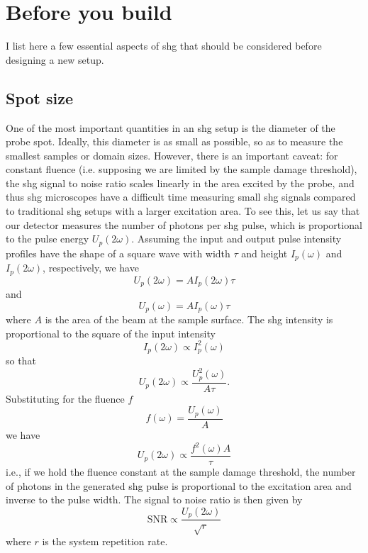 \section{Before you build}\label{sec:beforeyoubuild}

I list here a few essential aspects of \gls{shg} that should be considered before designing a new setup.

\subsection{Spot size}

One of the most important quantities in an \gls{shg} setup is the diameter of the probe spot.
Ideally, this diameter is as small as possible, so as to measure the smallest samples or domain sizes.
However, there is an important caveat: for constant fluence (i.e. supposing we are limited by the sample damage threshold), the \gls{shg} signal to noise ratio scales linearly in the area excited by the probe, and thus \gls{shg} microscopes have a difficult time measuring small \gls{shg} signals compared to traditional \gls{shg} setups with a larger excitation area.
To see this, let us say that our detector measures the number of photons per \gls{shg} pulse, which is proportional to the pulse energy $U_p(2\omega)$.
Assuming the input and output pulse intensity profiles have the shape of a square wave with width $\tau$ and height $I_p(\omega)$ and $I_p(2\omega)$, respectively, we have
\begin{equation}
U_p(2\omega) = A I_p(2\omega) \tau
\end{equation}
and
\begin{equation}
U_p(\omega) = A I_p(\omega) \tau
\end{equation}
where $A$ is the area of the beam at the sample surface.
The \gls{shg} intensity is proportional to the square of the input intensity
\begin{equation}
I_p(2\omega) \propto I_p^2(\omega)
\end{equation}
so that
\begin{equation}
U_p(2\omega) \propto \frac{U_p^2(\omega)}{A\tau}.
\end{equation}
Substituting for the fluence $f$
\begin{equation}
f(\omega) = \frac{U_p(\omega)}{A}
\end{equation}
we have
\begin{equation}
U_p(2\omega) \propto \frac{f^2(\omega)A}{\tau}
\end{equation}
i.e., if we hold the fluence constant at the sample damage threshold, the number of photons in the generated \gls{shg} pulse is proportional to the excitation area and inverse to the pulse width.
The signal to noise ratio is then given by
\begin{equation}
\mathrm{SNR} \propto \frac{U_p(2\omega)}{\sqrt{r}}
\end{equation}
where $r$ is the system repetition rate.

